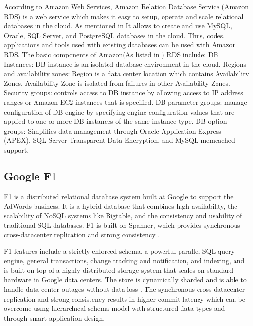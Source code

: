      According to Amazon Web Services, Amazon Relation Database
     Service (Amazon RDS) is a web service which makes it easy to
     setup, operate and scale relational databases in the cloud. As
     mentioned in \cite{www-AmazonRDS} It allows to create and use
     MySQL, Oracle, SQL Server, and PostgreSQL databases in the
     cloud. Thus, codes, applications and tools used with existing
     databases can be used with Amazon RDS. The basic components of
     Amazon(As listed in \cite{www-AmazonRDSComponents}) RDS include:
     DB Instances: DB instance is an isolated database environment in
     the cloud. Regions and availability zones: Region is a data
     center location which contains Availability Zones. Availability
     Zone is isolated from failures in other Availability
     Zones. Security groups: controls access to DB instance by
     allowing access to IP address ranges or Amazon EC2 instances that
     is specified. DB parameter groups: manage configuration of DB
     engine by specifying engine configuration values that are applied
     to one or more DB instances of the same instance type. DB option
     groups: Simplifies data management through Oracle Application
     Express (APEX), SQL Server Transparent Data Encryption, and MySQL
     memcached support.

     
\subsection{Google F1}

     F1 is a distributed relational database system built at Google to
     support the AdWords business. It is a hybrid database that
     combines high availability, the scalability of NoSQL systems like
     Bigtable, and the consistency and usability of traditional SQL
     databases. F1 is built on Spanner, which provides synchronous
     cross-datacenter replication and strong consistency
     \cite{paper-F1}.
     
     F1 features include a strictly enforced schema, a powerful
     parallel SQL query engine, general transactions, change tracking
     and notification, and indexing, and is built on top of a
     highly-distributed storage system that scales on standard
     hardware in Google data centers. The store is dynamically sharded
     and is able to handle data center outages without data loss
     \cite{paper-RDBMS} . The synchronous cross-datacenter
     replication and strong consistency results in higher commit
     latency which can be overcome using hierarchical schema model
     with structured data types and through smart application design.
     

